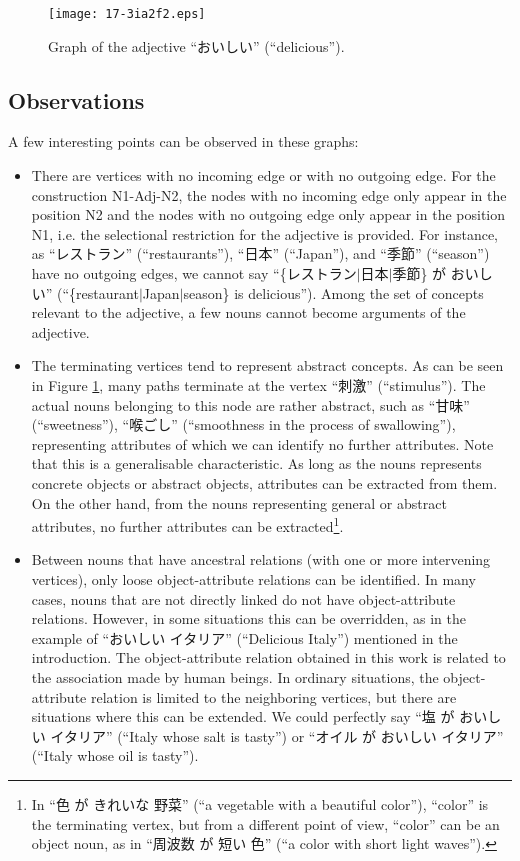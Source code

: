 \documentclass[english]{jnlp_1.4}
\begin{document}
\begin{figure}[t]
  \begin{center}
\texttt{[image: 17-3ia2f2.eps]}
 \end{center}
  \caption{Graph of the adjective ``おいしい'' (``delicious'').}
  \label{fig:oishii_graph}
\end{figure}



\subsection{Observations}

A few interesting points can be observed in these graphs:
\begin{itemize}
\item There are vertices with no incoming edge or with no outgoing edge.
For the construction N1-Adj-N2, the nodes with no incoming edge
only appear in the position N2 and the nodes with no outgoing edge
only appear in the position N1, i.e. the selectional restriction for the
adjective is provided. For instance, as ``レストラン'' (``restaurants''), 
``日本'' (``Japan''), and ``季節'' (``season'') have no outgoing edges, we cannot 
say ``\{レストラン$|$日本$|$季節\} が おいしい'' (``\{restaurant$|$Japan$|$season\}
is delicious''). Among the set of concepts relevant to the adjective,
a few nouns cannot become arguments of the adjective.
\item The terminating vertices tend to represent abstract concepts. As can be 
seen in Figure \ref{fig:oishii_graph}, many paths terminate at the vertex
``刺激'' (``stimulus''). The actual nouns belonging to this node
are rather abstract, such as ``甘味'' (``sweetness''), ``喉ごし'' 
(``smoothness in the process of swallowing''), representing attributes
of which we can identify no further attributes. Note that this is a
generalisable characteristic. As long as the nouns represents
concrete objects or abstract objects, attributes can be extracted from them.
On the other hand, from the nouns representing general or abstract attributes,
no further attributes can be extracted\footnote{In ``色 が きれいな 野菜'' (``a 
vegetable with a beautiful color''), ``color'' is the terminating vertex, 
but from a different point of view, ``color'' can be an object noun, as 
in ``周波数 が 短い 色'' (``a color with short light waves'').}.
\item Between nouns that have ancestral relations (with one or more 
intervening vertices), only loose object-attribute relations can be
identified. In many cases, nouns that are not directly linked do not
have object-attribute relations. However, in some situations this can
be overridden, as in the example of ``おいしい イタリア'' (``Delicious Italy'')
mentioned in the introduction. The object-attribute relation obtained
in this work is related to the association made by human beings. In
ordinary situations, the object-attribute relation is limited to the
neighboring vertices, but there are situations where this can be extended.
We could perfectly say ``塩 が おいしい イタリア'' (``Italy whose salt is tasty'')
or ``オイル が おいしい イタリア'' (``Italy whose oil is tasty'').
\end{itemize}
\end{document}
